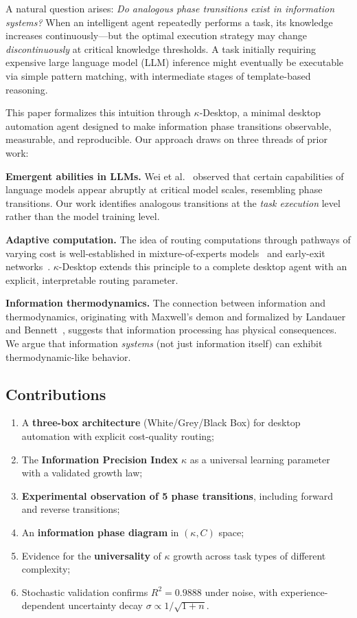 \documentclass[10pt,twocolumn]{article}
\newcommand{\kap}{\kappa}
\newcommand{\kdes}{$\kappa$-Desktop}
\begin{document}
A natural question arises: \textit{Do analogous phase 
transitions exist in information systems?} When an intelligent 
agent repeatedly performs a task, its knowledge increases 
continuously---but the optimal execution strategy may change 
\textit{discontinuously} at critical knowledge thresholds. A 
task initially requiring expensive large language model (LLM) 
inference might eventually be executable via simple pattern 
matching, with intermediate stages of template-based reasoning.

This paper formalizes this intuition through \kdes{}, a 
minimal desktop automation agent designed to make information 
phase transitions observable, measurable, and reproducible. 
Our approach draws on three threads of prior work:

\textbf{Emergent abilities in LLMs.}
Wei et al.~\cite{wei2022} observed that certain capabilities 
of language models appear abruptly at critical model scales, 
resembling phase transitions. Our work identifies analogous 
transitions at the \textit{task execution} level rather than 
the model training level.

\textbf{Adaptive computation.}
The idea of routing computations through pathways of varying 
cost is well-established in mixture-of-experts 
models~\cite{shazeer2017} and early-exit 
networks~\cite{teerapittayanon2016}. \kdes{} extends this 
principle to a complete desktop agent with an explicit, 
interpretable routing parameter.

\textbf{Information thermodynamics.}
The connection between information and thermodynamics, 
originating with Maxwell's demon and formalized by 
Landauer~\cite{landauer1961} and 
Bennett~\cite{bennett1982}, suggests that information 
processing has physical consequences. We argue that 
information \textit{systems} (not just information itself) 
can exhibit thermodynamic-like behavior.

\subsection{Contributions}

\begin{enumerate}[leftmargin=*, itemsep=2pt]
  \item A \textbf{three-box architecture} (White/Grey/Black 
    Box) for desktop automation with explicit cost-quality 
    routing;
  \item The \textbf{Information Precision Index} $\kap$ as 
    a universal learning parameter with a validated growth 
    law;
  \item \textbf{Experimental observation of 5 phase 
    transitions}, including forward and reverse transitions;
  \item An \textbf{information phase diagram} in 
    $(\kap, C)$ space;
  \item Evidence for the \textbf{universality} of $\kap$ 
    growth across task types of different complexity;
  \item Stochastic validation confirms $R^2 = 0.9888$ 
    under noise, with experience-dependent uncertainty 
    decay $\sigma \propto 1/\sqrt{1+n}$.
\end{enumerate}
\end{document}
